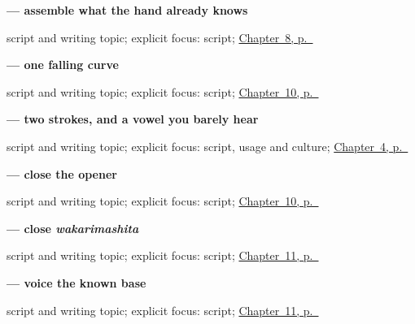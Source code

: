 \noindent\begin{minipage}[t]{\linewidth}
\raggedright
\textbf{ — assemble what the hand already knows}\par
\footnotesize script and writing topic; explicit focus: script; \hyperref[ch:ja-sayounara]{Chapter~8, p.~\pageref*{ch:ja-sayounara}}
\end{minipage}\par\smallskip

\noindent\begin{minipage}[t]{\linewidth}
\raggedright
\textbf{ — one falling curve}\par
\footnotesize script and writing topic; explicit focus: script; \hyperref[ch:ja-slower-please]{Chapter~10, p.~\pageref*{ch:ja-slower-please}}
\end{minipage}\par\smallskip

\noindent\begin{minipage}[t]{\linewidth}
\raggedright
\textbf{ — two strokes, and a vowel you barely hear}\par
\footnotesize script and writing topic; explicit focus: script, usage and culture; \hyperref[ch:ja-polite-thanks]{Chapter~4, p.~\pageref*{ch:ja-polite-thanks}}
\end{minipage}\par\smallskip

\noindent\begin{minipage}[t]{\linewidth}
\raggedright
\textbf{ — close the opener}\par
\footnotesize script and writing topic; explicit focus: script; \hyperref[ch:ja-slower-please]{Chapter~10, p.~\pageref*{ch:ja-slower-please}}
\end{minipage}\par\smallskip

\noindent\begin{minipage}[t]{\linewidth}
\raggedright
\textbf{ — close \emph{wakarimashita}}\par
\footnotesize script and writing topic; explicit focus: script; \hyperref[ch:ja-body-seven]{Chapter~11, p.~\pageref*{ch:ja-body-seven}}
\end{minipage}\par\smallskip

\noindent\begin{minipage}[t]{\linewidth}
\raggedright
\textbf{ — voice the known base}\par
\footnotesize script and writing topic; explicit focus: script; \hyperref[ch:ja-body-seven]{Chapter~11, p.~\pageref*{ch:ja-body-seven}}
\end{minipage}\par\smallskip

